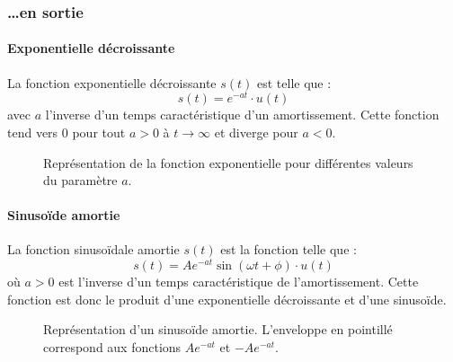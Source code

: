 \subsubsection{\ldots en sortie}

\paragraph{Exponentielle décroissante}
La fonction exponentielle décroissante $s(t)$ est telle que :
$$
s(t)=e^{-at}\cdot u(t)
$$  
avec $a$ l'inverse d'un temps caractéristique d'un amortissement.
Cette fonction tend vers 0 pour tout $a>0$ à $t\rightarrow\infty$ et 
diverge pour $a<0$.
\begin{figure}[!h]
    \centering
    
    \caption{Représentation de la fonction exponentielle pour 
             différentes valeurs du paramètre $a$.\label{fig-exp}}
\end{figure}

\paragraph{Sinuso\"ide amortie}
La fonction sinuso\"idale amortie $s(t)$ est la fonction telle que :
$$
s(t)=Ae^{-at}\sin{(\omega t +\phi)}\cdot u(t)
$$
où $a>0$ est l'inverse d'un temps caractéristique de l'amortissement.
Cette fonction est donc le produit d'une exponentielle décroissante et 
d'une sinuso\"ide.
\begin{figure}[!b]
    \centering
    
    \caption{Représentation d'un sinuso\"ide amortie. L'enveloppe en pointillé 
             correspond aux fonctions $Ae^{-at}$ et $-Ae^{-at}$.
             \label{fig-sin_amor}}
\end{figure}

\clearpage
